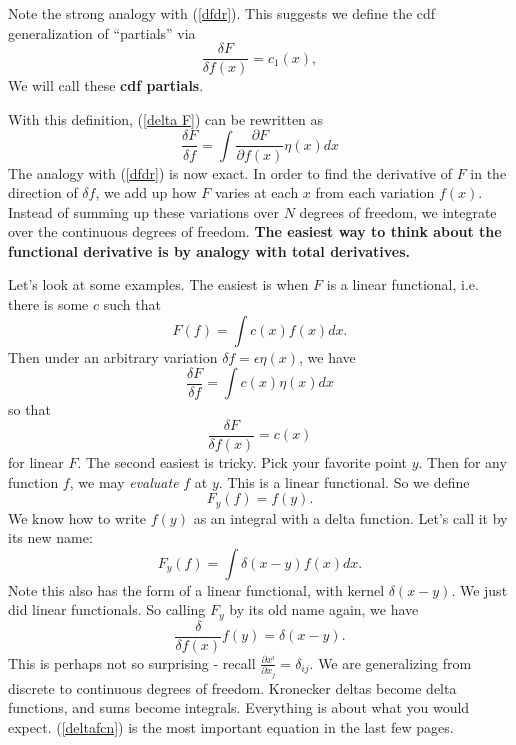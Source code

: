 \documentclass[main.tex]{subfiles}
\begin{document}
Note the strong analogy with (\ref{dfdr}). This suggests we define the cdf generalization of ``partials'' via
\begin{equation}
\frac{\delta F}{\delta f(x)} = c_1 (x),
\end{equation}
We will call these \textbf{cdf partials}.

With this definition, (\ref{delta F}) can be rewritten as 
\begin{equation} \label{dFdf}
\boxed{\frac{\delta F}{\delta f} = \int \frac{\partial F}{\partial f(x)} \eta (x) dx}
\end{equation}
The analogy with (\ref{dfdr}) is now exact. In order to find the derivative of $F$ in the direction of $\delta{f}$, we add up how $F$ varies at each $x$ from each variation $f(x)$. Instead of summing up these variations over $N$ degrees of freedom, we integrate over the continuous degrees of freedom. \textbf{The easiest way to think about the functional derivative is by analogy with total derivatives.}

Let's look at some examples. The easiest is when $F$ is a linear functional, i.e. there is some $c$ such that
\[
F(f) = \int c(x) f(x) dx.
\]
Then under an arbitrary variation $\delta f = \epsilon \eta(x)$, we have
\[
\frac{\delta F}{\delta f} = \int c(x) \eta (x) dx
\]
so that
\begin{equation} \label{linearF}
\boxed{\frac{\delta F}{\delta f(x)} = c(x)}
\end{equation}
for linear $F$. The second easiest is tricky. Pick your favorite point $y$. Then for any function $f$, we may \textit{evaluate} $f$ at $y$. This is a linear functional. So we define
\[
F_y (f) = f(y).
\]
We know how to write $f(y)$ as an integral with a delta function. Let's call it by its new name:
\[
F_y (f) = \int \delta(x-y) f(x) dx.
\]
Note this also has the form of a linear functional, with kernel $\delta (x-y)$. We just did linear functionals. So calling $F_y$ by its old name again, we have
\begin{equation} \label{deltafcn}
\boxed{\frac{\delta}{\delta f(x)} f(y) = \delta (x -y)}.
\end{equation}
This is perhaps not so surprising - recall $\frac{\partial x^i}{\partial x_j} = \delta_{ij}$. We are generalizing from discrete to continuous degrees of freedom. Kronecker deltas become delta functions, and sums become integrals. Everything is about what you would expect. (\ref{deltafcn}) is the most important equation in the last few pages. 
\end{document}
